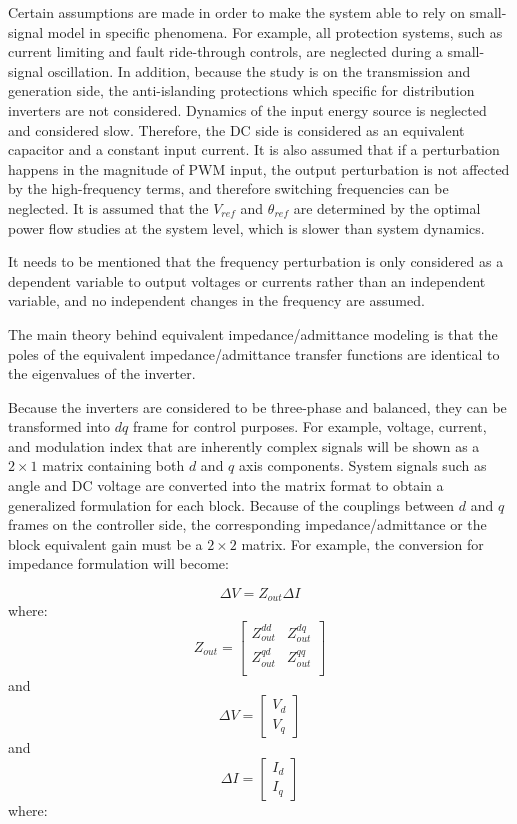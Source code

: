 Certain assumptions are made in order to make the system able to rely on small-signal model in specific phenomena. For example, all protection systems, such as current limiting and fault ride-through controls, are neglected during a small-signal oscillation. In addition, because the study is on the transmission and generation side, the anti-islanding protections which specific for distribution inverters are not considered. Dynamics of the input energy source is neglected and considered slow. Therefore, the DC side is considered as an equivalent capacitor and a constant input current. It is also assumed that if a perturbation happens in the magnitude of \gls{PWM} input, the output perturbation is not affected by the high-frequency terms, and therefore switching frequencies can be neglected. It is assumed that the $V_{ref}$ and $\theta_{ref}$ are determined by the optimal power flow studies at the system level, which is slower than system dynamics.

 It needs to be mentioned that the frequency perturbation is only considered as a dependent variable to output voltages or currents rather than an independent variable, and no independent changes in the frequency are assumed.


The main theory behind equivalent impedance/admittance modeling is that the poles of the equivalent impedance/admittance transfer functions are identical to the eigenvalues of the inverter.

Because the inverters are considered to be three-phase and balanced, they can be transformed into $dq$ frame for control purposes. For example, voltage, current, and modulation index that are inherently complex signals will be shown as a $2\times 1$ matrix containing both $d$ and $q$ axis components. System signals such as angle and DC voltage are converted into the matrix format to obtain a generalized formulation for each block. Because of the couplings between $d$ and $q$ frames on the controller side, the corresponding impedance/admittance or the block equivalent gain must be a $2 \times 2$ matrix. 
For example, the conversion for impedance formulation will become:

\begin{equation}
\Delta V=Z_{out} \Delta I
\end{equation}
where: 
\begin{equation}
Z_{out}=\left[\begin{matrix}Z_{out}^{dd}&Z_{out}^{dq}\\Z_{out}^{qd}&Z_{out}^{qq}\\\end{matrix}\right]
\end{equation}
and
\begin{equation}
\Delta V=\left[\begin{matrix}V_d\\V_q\end{matrix}\right] \end{equation}and \begin{equation}\Delta I=\left[\begin{matrix}I_d\\I_q\end{matrix}\right]
 \end{equation}
where:

